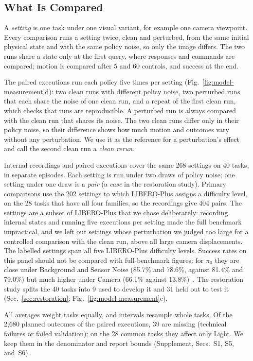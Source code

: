 \subsection{What Is Compared}
\label{sec:comparisons}
A \emph{setting} is one task under one visual variant, for example one camera viewpoint. Every comparison runs a setting twice, clean and perturbed, from the same initial physical state and with the same policy noise, so only the image differs. The two runs share a state only at the first query, where responses and commands are compared; motion is compared after 5 and 60 controls, and success at the end.

The paired executions run each policy five times per setting (Fig.~\ref{fig:model-measurement}d): two clean runs with different policy noise, two perturbed runs that each share the noise of one clean run, and a repeat of the first clean run, which checks that runs are reproducible. A perturbed run is always compared with the clean run that shares its noise. The two clean runs differ only in their policy noise, so their difference shows how much motion and outcomes vary without any perturbation. We use it as the reference for a perturbation's effect and call the second clean run a \emph{clean rerun}.

Internal recordings and paired executions cover the same 268 settings on 40 tasks, in separate episodes. Each setting is run under two draws of policy noise; one setting under one draw is a \emph{pair} (a \emph{case} in the restoration study). Primary comparisons use the 202 settings to which LIBERO-Plus assigns a difficulty level, on the 28 tasks that have all four families, so the recordings give 404 pairs. The settings are a subset of LIBERO-Plus that we chose deliberately: recording internal states and running five executions per setting made the full benchmark impractical, and we left out settings whose perturbation we judged too large for a controlled comparison with the clean run, above all large camera displacements. The labelled settings span all five LIBERO-Plus difficulty levels. Success rates on this panel should not be compared with full-benchmark figures: for $\pi_0$ they are close under Background and Sensor Noise (85.7\% and 78.6\%, against 81.4\% and 79.0\%) but much higher under Camera (66.1\% against 13.8\%)~\cite{fei2026liberoplus}. The restoration study splits the 40 tasks into 9 used to develop it and 31 held out to test it (Sec.~\ref{sec:restoration}; Fig.~\ref{fig:model-measurement}c).



All averages weight tasks equally, and intervals resample whole tasks. Of the 2,680 planned outcomes of the paired executions, 39 are missing (technical failures or failed validation); on the 28 common tasks they affect only Light. We keep them in the denominator and report bounds (Supplement, Secs.~S1, S5, and~S6).
